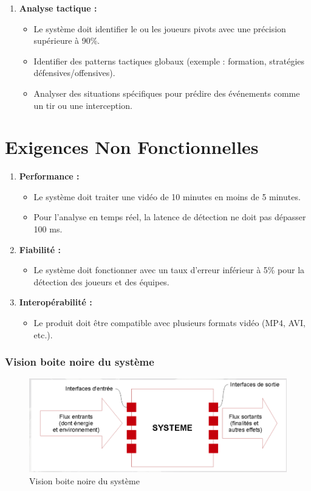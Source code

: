 \begin{enumerate}
    \item \textbf{Analyse tactique :}
    \begin{itemize}
        \item Le système doit identifier le ou les joueurs pivots avec une précision supérieure à 90\%.
        \item Identifier des patterns tactiques globaux (exemple : formation, stratégies défensives/offensives).
        \item Analyser des situations spécifiques pour prédire des événements comme un tir ou une interception.
    \end{itemize}
\end{enumerate}

\section*{Exigences Non Fonctionnelles}
\begin{enumerate}
    \item \textbf{Performance :}
    \begin{itemize}
        \item Le système doit traiter une vidéo de 10 minutes en moins de 5 minutes.
        \item Pour l’analyse en temps réel, la latence de détection ne doit pas dépasser 100 ms.
    \end{itemize}
    
    \item \textbf{Fiabilité :}
    \begin{itemize}
        \item Le système doit fonctionner avec un taux d’erreur inférieur à 5\% pour la détection des joueurs et des équipes.
    \end{itemize}
    
    \item \textbf{Interopérabilité :}
    \begin{itemize}
        \item Le produit doit être compatible avec plusieurs formats vidéo (MP4, AVI, etc.).
    \end{itemize}
\end{enumerate}
\subsubsection{Vision boite noire du système}
\begin{figure}[!h]
    \begin{center}
        \includegraphics[scale=0.5]{images/boite_noire.png}
        \caption{Vision boite noire du système}
    \end{center}
\end{figure}
